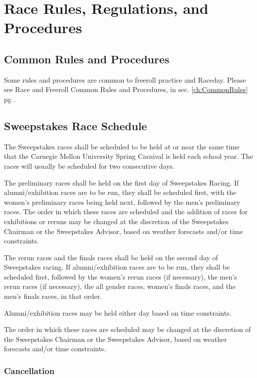 \chapter{Race Rules, Regulations, and Procedures}
\label{ch:RaceRules}

\section{Common Rules and Procedures}
	Some rules and procedures are common to freeroll practice and Raceday. Please see Race and Freeroll Common Rules and Procedures, in sec. \ref{ch:CommonRules} pg \pageref{ch:CommonRules}.

\section{Sweepstakes Race Schedule}

	The Sweepstakes races shall be scheduled to be held at or near the same time that the Carnegie Mellon University Spring Carnival is held each school year. The races will usually be scheduled for two consecutive days.

	The preliminary races shall be held on the first day of Sweepstakes Racing.  If alumni/exhibition races are to be run, they shall be scheduled first, with the women's preliminary races being held next, followed by the men's preliminary races. The order in which these races are scheduled and the addition of races for exhibitions or reruns may be changed at the discretion of the Sweepstakes Chairman or the Sweepstakes Advisor, based on weather forecasts and/or time constraints.

	The rerun races and the finals races shall be held on the second day of Sweepstakes racing. If alumni/exhibition races are to be run, they shall be scheduled first, followed by the women's rerun races (if necessary), the men's rerun races (if necessary), the all gender races,  women's finals races, and the men's finals races, in that order. 

	Alumni/exhibition races may be held either day based on time constraints. 

	The order in which these races are scheduled may be changed at the discretion of the Sweepstakes Chairman or the Sweepstakes Advisor, based on weather forecasts and/or time constraints.


\subsection{Cancellation}

